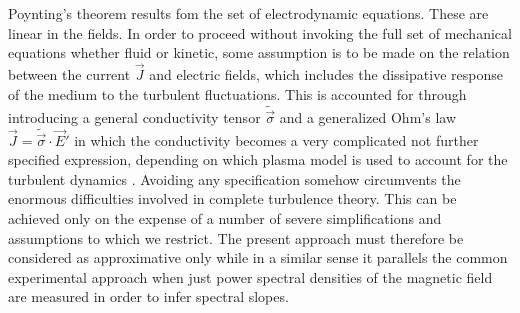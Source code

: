 \documentclass[ ]{copernicus2}
\begin{document}
{{Poynting's theorem results fom the set of electrodynamic equations. These are linear in the fields. In order to proceed without invoking the full set of mechanical equations whether fluid or kinetic, some assumption is to be made on the relation between the current $\vec{J}$ and electric fields, which includes the dissipative response of the medium to the turbulent fluctuations. This is accounted for through introducing a general conductivity tensor $\tilde{\vec{\sigma}}$ and a generalized Ohm's law $\vec{J}=\tilde{\vec{\sigma}}\cdot\vec{E}'$ in which the conductivity becomes a very complicated not further specified expression, depending on which plasma model is used to account for the turbulent dynamics \citep[cf., e.g.,][]{krall1973}. Avoiding any specification somehow circumvents the enormous difficulties involved in complete turbulence theory. This can be achieved only on the expense of a number of severe simplifications and assumptions to which we restrict. The present approach must therefore be considered as approximative only while in a similar sense it parallels the common experimental approach when just power spectral densities of the magnetic field are measured in order to infer spectral slopes.} 

}
\end{document}
